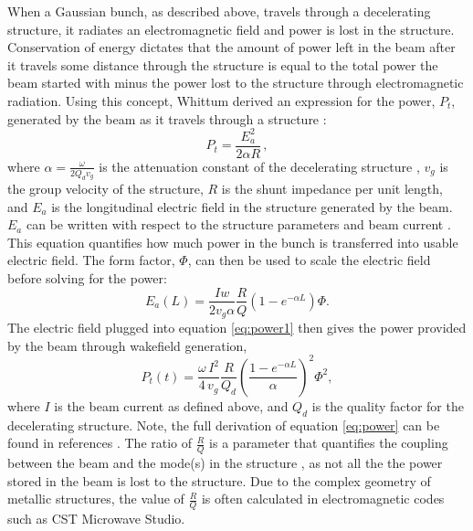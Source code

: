 When a Gaussian bunch, as described above, travels through a 
decelerating structure, it radiates an electromagnetic field and 
power is lost in the structure. Conservation of energy dictates 
that the amount of power left in the beam 
after it travels some distance through the structure is equal to 
the total power the beam started with
minus the power lost to the structure through electromagnetic radiation. 
Using this concept, Whittum derived an expression for the power, $P_t$, 
generated by the beam as it travels through a structure \cite{Whittum}: 
\begin{equation}
P_t = \frac{E^2_a}{2 \alpha R}\, ,
\label{eq:power1}
\end{equation} 
where $\alpha=\frac{\omega}{2Q_{d}v_{g}}$ is the attenuation constant of the 
decelerating structure \cite{CLICdesignReport, Whittum}, 
$v_g$ is the group velocity of the structure, $R$ is the shunt impedance
per unit length, and $E_a$ is the longitudinal electric field in the structure
generated by the beam. 
$E_a$ can be written with respect to 
the structure parameters and beam current \cite{PETSeq}. 
This equation quantifies how much power in the bunch is transferred into usable electric field.
The form factor, $\Phi$, can then be used to scale the electric field before 
solving for the power: 
\begin{equation}
E_a\left(L\right) = \frac{Iw}{2 v_g \alpha} \frac{R}{Q} \left(1-e^{-\alpha L}\right) \Phi.
\end{equation}
The electric field plugged into equation \ref{eq:power1} then gives the power provided
by the beam through wakefield generation,
\begin{equation}
P_{t}(t)=\frac{\omega\,I^{2}}{4\,v_{g}}\frac{R}{Q_d}\left(\frac{1-e^{-\alpha L}}{\alpha}\right)^2\Phi^{2},
\label{eq:power}
\end{equation}
where $I$ is the beam current as defined above, and $Q_{d}$ is the quality factor for the decelerating
structure. Note, the full derivation of equation \ref{eq:power} can be found in references
\cite{PETSeq}. The ratio of $\frac{R}{Q}$ is a parameter that quantifies the coupling between
the beam and the mode(s) in the structure \cite{Whittum}, as not all the the power stored in 
the beam is lost to the structure. Due to the complex geometry of metallic structures,
the value of $\frac{R}{Q}$ is often calculated in electromagnetic codes such
as CST Microwave Studio. 


